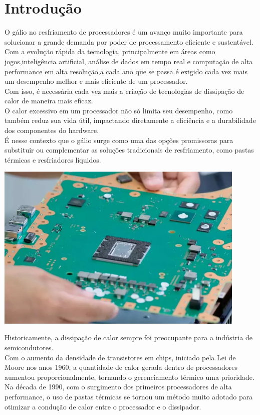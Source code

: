 \documentclass[12pt]{article}
\begin{document}
\section{Introdução}
O gálio no resfriamento de processadores é um avanço muito importante para solucionar a grande demanda por poder de processamento eficiente e sustentável.
\\
Com a evolução rápida da tecnologia, principalmente em áreas como jogos,inteligência artificial, análise de dados em tempo real e computação de alta performance em alta resolução,a cada ano que se passa é exigido cada vez mais um desempenho melhor e mais eficiente de um processador. 
\\
Com isso, é necessária cada vez mais a criação de tecnologias de dissipação de calor de maneira mais eficaz. 
\\
O calor excessivo em um processador não só limita seu desempenho, como também reduz sua vida útil, impactando diretamente a eficiência e a durabilidade dos componentes do hardware. 
\\
É nesse contexto que o gálio surge como uma das opções promissoras para substituir ou complementar as soluções tradicionais de resfriamento, como pastas térmicas e resfriadores líquidos.
\begin{adjustbox}{center,caption={Placa Mãe do PS5 (Imagem: PlayStation/Reprodução)},nofloat=figure,vspace=\bigskipamount}
    \centering
    \includegraphics[width=12cm]{mobo.png}
\end{adjustbox}
Historicamente, a dissipação de calor sempre foi preocupante para a indústria de semicondutores. 
\\
Com o aumento da densidade de transistores em chips, iniciado pela Lei de Moore nos anos 1960, a quantidade de calor gerada dentro de processadores aumentou proporcionalmente, tornando o gerenciamento térmico uma prioridade. Na década de 1990, com o surgimento dos primeiros processadores de alta performance, o uso de pastas térmicas se tornou um método muito adotado para otimizar a condução de calor entre o processador e o dissipador. 
\end{document}

